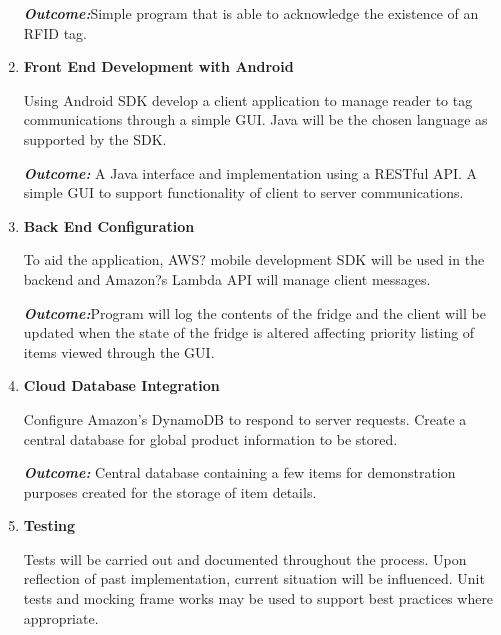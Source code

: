\documentclass[a4paper, 11pt]{article}
\begin{document}
\begin{enumerate}
\begin{flushleft}
	\emph{\textbf{Outcome:}}Simple program that is able to acknowledge the existence of an RFID tag. 
		  \vspace{\baselineskip}

  	\end{flushleft}
	   \item \textbf{Front End Development with Android}
   	\begin{flushleft}Using Android SDK develop a client application to manage reader to tag communications through a simple GUI. Java will be the chosen language as supported by the SDK.
	
	\emph{\textbf{Outcome:}} A Java interface and implementation using a RESTful API. A simple GUI to support functionality of client to server communications. 
	\end{flushleft}
	\vspace{\baselineskip}
 
   \item \textbf{Back End Configuration }
   	\begin{flushleft}To aid the application, AWS? mobile development SDK will be used in the backend and Amazon?s Lambda API will manage client messages. 
	
	\emph{\textbf{Outcome:}}Program will log the contents of the fridge and the client will be updated when the state of the fridge is altered affecting priority listing of items viewed through the GUI.	\vspace{\baselineskip}
  	\end{flushleft}
	   \item \textbf{Cloud Database Integration}
   	\begin{flushleft} Configure Amazon's DynamoDB to respond to server requests. Create a central database for global product information to be stored.
	
	\emph{\textbf{Outcome:}} Central database containing a few items for demonstration purposes created for the storage of item details. 
	\vspace{\baselineskip}
  	\end{flushleft}
	 
   \item \textbf{Testing}
   	\begin{flushleft}Tests will be carried out and documented throughout the process. Upon reflection of past implementation, current situation will be influenced. Unit tests and mocking frame works may be used to support best practices where appropriate.
	  	

\end{flushleft}
\end{enumerate}
\end{document}
